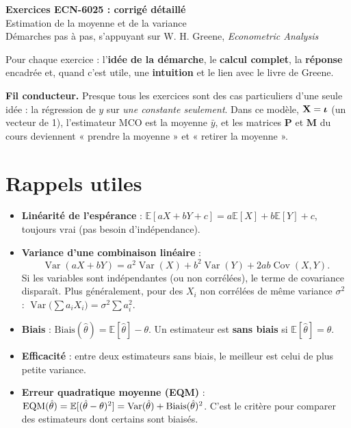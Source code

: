 \documentclass[11pt,a4paper]{article}
\newcommand{\vi}{\bm{\iota}}
\newcommand{\Pm}{\mathbf{P}}\newcommand{\Mm}{\mathbf{M}}
\newcommand{\E}{\mathbb{E}}\newcommand{\Var}{\operatorname{Var}}\newcommand{\Cov}{\operatorname{Cov}}
\begin{document}
\begin{center}
{\LARGE\bfseries Exercices ECN-6025 : corrigé détaillé}\\[6pt]
{\large Estimation de la moyenne et de la variance}\\[4pt]
{\small Démarches pas à pas, s'appuyant sur W. H. Greene, \emph{Econometric Analysis}}
\end{center}

\begin{tcolorbox}[colback=white,colframe=NavyBlue,title=Comment lire ce corrigé]
Pour chaque exercice : l'\textbf{idée de la démarche}, le \textbf{calcul complet}, la \textbf{réponse} encadrée et, quand c'est utile, une \textbf{intuition} et le lien avec le livre de Greene.

\textbf{Fil conducteur.} Presque tous les exercices sont des cas particuliers d'une seule idée : la régression de $y$ sur \emph{une constante seulement}. Dans ce modèle, $\vX=\vi$ (un vecteur de 1), l'estimateur MCO est la moyenne $\bar y$, et les matrices $\Pm$ et $\Mm$ du cours deviennent « prendre la moyenne » et « retirer la moyenne ».
\end{tcolorbox}

\tableofcontents

\section{Rappels utiles}

\begin{itemize}
\item \textbf{Linéarité de l'espérance} : $\E[aX+bY+c]=a\E[X]+b\E[Y]+c$, toujours vrai (pas besoin d'indépendance).
\item \textbf{Variance d'une combinaison linéaire} :
\[\Var(aX+bY)=a^2\Var(X)+b^2\Var(Y)+2ab\Cov(X,Y).\]
Si les variables sont indépendantes (ou non corrélées), le terme de covariance disparaît. Plus généralement, pour des $X_i$ non corrélées de même variance $\sigma^2$ : $\Var\big(\sum a_iX_i\big)=\sigma^2\sum a_i^2$.
\item \textbf{Biais} : $\text{Biais}(\hat\theta)=\E[\hat\theta]-\theta$. Un estimateur est \textbf{sans biais} si $\E[\hat\theta]=\theta$.
\item \textbf{Efficacité} : entre deux estimateurs sans biais, le meilleur est celui de plus petite variance.
\item \textbf{Erreur quadratique moyenne (EQM)} : $\EQM(\hat\theta)=\E[(\hat\theta-\theta)^2]=\Var(\hat\theta)+\text{Biais}(\hat\theta)^2$. C'est le critère pour comparer des estimateurs dont certains sont biaisés.
\end{itemize}
\end{document}
